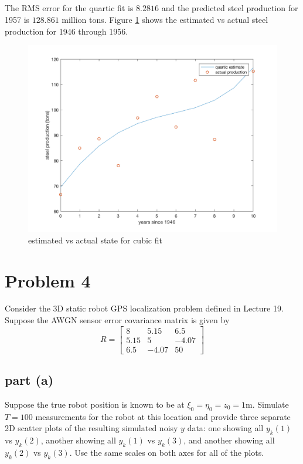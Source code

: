 \documentclass[11pt]{article}
\begin{document}
\subparagraph*{}
The RMS error for the quartic fit is $8.2816$ and the predicted steel production for 1957 is $128.861$ million tons. Figure \ref{p1_plot4} shows the estimated vs actual steel production for 1946 through 1956.
\begin{figure}[h!]
	\centering
	\includegraphics[width=0.8\linewidth]{p1_plot4.png}
	\caption{estimated vs actual state for cubic fit}
	\label{p1_plot4}
\end{figure}

\section*{Problem 4}
Consider the 3D static robot GPS localization problem defined in Lecture 19. Suppose the AWGN sensor error covariance matrix is given by 
\begin{equation*}
	R=\begin{bmatrix} 8 & 5.15 & 6.5 \\ 5.15 & 5 & -4.07 \\ 6.5 & -4.07 & 50 \end{bmatrix}
\end{equation*}

\subsection*{part (a)}
Suppose the true robot position is known to be at $\xi_0=\eta_0=z_0=1\text{m}$. Simulate $T=100$ measurements for the robot at this location and provide three separate 2D scatter plots of the resulting simulated noisy $y$ data: one showing all $y_k(1)$ vs $y_k(2)$, another showing all $y_k(1)$ vs $y_k(3)$, and another showing all $y_k(2)$ vs $y_k(3)$. Use the same scales on both axes for all of the plots.
\end{document}
